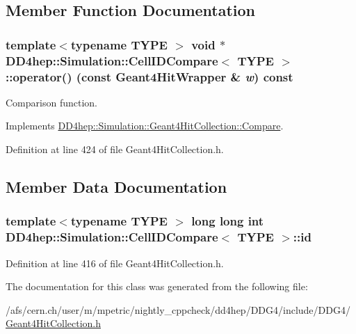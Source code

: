 \subsection{Member Function Documentation}
\hypertarget{class_d_d4hep_1_1_simulation_1_1_cell_i_d_compare_af0477f875a7b24c338da10245a1a1253}{
\subsubsection[{operator()}]{\setlength{\rightskip}{0pt plus 5cm}template$<$typename TYPE $>$ void $\ast$ {\bf DD4hep::Simulation::CellIDCompare}$<$ TYPE $>$::operator() (const {\bf Geant4HitWrapper} \& {\em w}) const}}
\label{class_d_d4hep_1_1_simulation_1_1_cell_i_d_compare_af0477f875a7b24c338da10245a1a1253}


Comparison function. 

Implements \hyperlink{class_d_d4hep_1_1_simulation_1_1_geant4_hit_collection_1_1_compare_ad81521e6dfc48aaee6d2dd9464a7afeb}{DD4hep::Simulation::Geant4HitCollection::Compare}.

Definition at line 424 of file Geant4HitCollection.h.

\subsection{Member Data Documentation}
\hypertarget{class_d_d4hep_1_1_simulation_1_1_cell_i_d_compare_a7d3ef2b98bd08b158688ac8f03ea098f}{
\subsubsection[{id}]{\setlength{\rightskip}{0pt plus 5cm}template$<$typename TYPE $>$ long long int {\bf DD4hep::Simulation::CellIDCompare}$<$ TYPE $>$::{\bf id}}}
\label{class_d_d4hep_1_1_simulation_1_1_cell_i_d_compare_a7d3ef2b98bd08b158688ac8f03ea098f}


Definition at line 416 of file Geant4HitCollection.h.

The documentation for this class was generated from the following file:\begin{DoxyCompactItemize}
\item 
/afs/cern.ch/user/m/mpetric/nightly\_\-cppcheck/dd4hep/DDG4/include/DDG4/\hyperlink{_geant4_hit_collection_8h}{Geant4HitCollection.h}\end{DoxyCompactItemize}
